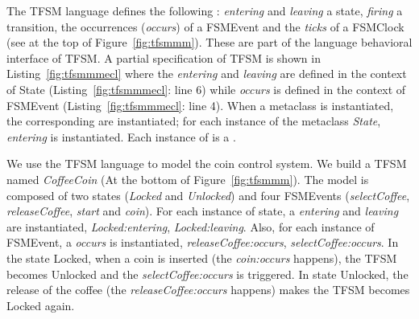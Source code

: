 The TFSM language defines the following \dse: \emph{entering} and \emph{leaving} a state, \emph{firing} a transition, the occurrences (\emph{occurs}) of a FSMEvent and the \emph{ticks} of a FSMClock (see at the top of Figure~\ref{fig:tfsmmm}). These \dse are part of the language behavioral interface of TFSM. %
A partial \ecl specification of TFSM is shown in Listing~\ref{fig:tfsmmmecl} where the \dse \textit{entering} and \textit{leaving} are defined in the context of State (Listing~\ref{fig:tfsmmmecl}: line 6) while \textit{occurs} is defined in the context of FSMEvent (Listing~\ref{fig:tfsmmmecl}: line 4). When a metaclass is instantiated, the corresponding \dse are instantiated; \eg for each instance of the metaclass \emph{State}, \dse \textit{entering} is instantiated. Each instance of \dse is a \mse. 
	
We use the TFSM language to model the coin control system. We build a TFSM named \emph{CoffeeCoin} (At the bottom of Figure~\ref{fig:tfsmmm}). The model is composed of two states (\emph{Locked} and \emph{Unlocked}) and four FSMEvents (\emph{selectCoffee}, \emph{releaseCoffee}, \emph{start} and \emph{coin}). For each instance of state, a \dse \emph{entering} and \emph{leaving} are instantiated, \eg \emph{Locked:entering}, \emph{Locked:leaving}. Also, for each instance of FSMEvent, a \dse \emph{occurs} is instantiated, \eg \emph{releaseCoffee:occurs}, \emph{selectCoffee:occurs}. In the state Locked, when a coin is inserted (the \mse \emph{coin:occurs} happens), the TFSM becomes Unlocked and the \mse \emph{selectCoffee:occurs} is triggered. In state Unlocked, the release of the coffee (the \mse \emph{releaseCoffee:occurs} happens) makes the TFSM becomes Locked again.   
	

